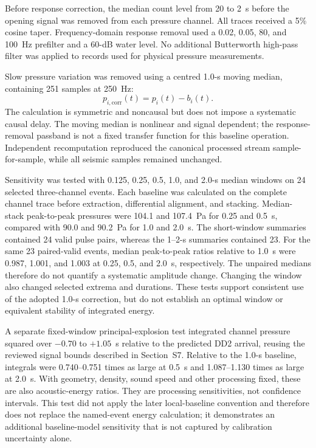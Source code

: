 \documentclass[]{seismica}
\begin{document}
Before response correction, the median count level from 20 to 2~s before the
opening signal was removed from each pressure channel. All traces received a
5\% cosine taper. Frequency-domain response removal used a 0.02, 0.05, 80, and
100~Hz prefilter and a 60-dB water level. No additional Butterworth high-pass
filter was applied to records used for physical pressure measurements.

Slow pressure variation was removed using a centred 1.0-s moving median,
containing 251 samples at 250~Hz:
\begin{equation}
 p_{i,\mathrm{corr}}(t)=p_i(t)-b_i(t).
\end{equation}
The calculation is symmetric and noncausal but does not impose a systematic
causal delay. The moving median is nonlinear and signal dependent; the
response-removal passband is not a fixed transfer function for this baseline
operation. Independent recomputation reproduced the canonical processed
stream sample-for-sample, while all seismic samples remained unchanged.

Sensitivity was tested with 0.125, 0.25, 0.5, 1.0, and 2.0-s median windows on
24 selected three-channel events. Each baseline was calculated on the complete
channel trace before extraction, differential alignment, and stacking.
Median-stack peak-to-peak pressures were 104.1 and 107.4~Pa for 0.25 and
0.5~s, compared with 90.0 and 90.2~Pa for 1.0 and 2.0~s. The short-window
summaries contained 24 valid pulse pairs, whereas the 1--2-s summaries contained
23. For the same 23 paired-valid events, median peak-to-peak ratios relative
to 1.0~s were 0.987, 1.001, and 1.003 at 0.25, 0.5, and 2.0~s, respectively.
The unpaired medians therefore do not quantify a systematic amplitude change.
Changing the window
also changed selected extrema and durations. These tests support consistent
use of the adopted 1.0-s correction, but do not establish an optimal window
or equivalent stability of integrated energy.

A separate fixed-window principal-explosion test integrated channel pressure
squared over $-0.70$ to $+1.05$~s relative to the predicted DD2 arrival, reusing
the reviewed signal bounds described in Section~S7. Relative to the 1.0-s
baseline, integrals were 0.740--0.751 times as large at 0.5~s and
1.087--1.130 times as large at 2.0~s. With geometry, density, sound speed and
other processing fixed, these are also acoustic-energy ratios. They are
processing sensitivities, not confidence intervals. This test did not apply
the later local-baseline convention and therefore does not replace the
named-event energy calculation; it demonstrates an additional baseline-model
sensitivity that is not captured by calibration uncertainty alone.
\end{document}
